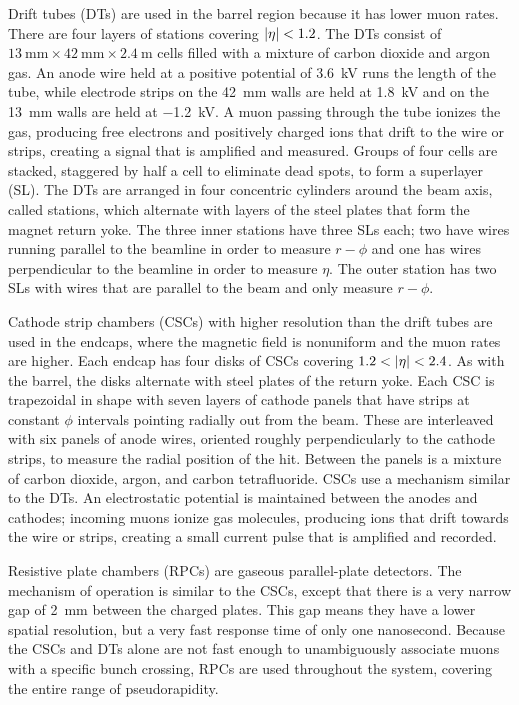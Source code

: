 Drift tubes (DTs) are used in the barrel region because it has lower muon rates.
There are four layers of stations covering $\lvert\eta\rvert < 1.2$. The DTs consist
of $\SI{13}{\mm} \times \SI{42}{\mm} \times \SI{2.4}{\meter}$ cells filled with
a mixture of carbon dioxide and argon gas. An anode wire held at a positive
potential of \SI{3.6}{\kilo\volt} runs the length of the tube, while electrode
strips on the \SI{42}{\mm} walls are held at \SI{1.8}{\kilo\volt} and on the
\SI{13}{\mm} walls are held at \SI{-1.2}{\kilo\volt}. A muon passing through the
tube ionizes the gas, producing free electrons and positively charged ions that
drift to the wire or strips, creating a signal that is amplified and measured.
Groups of four cells are stacked, staggered by half a cell to eliminate dead
spots, to form a superlayer (SL). The DTs are arranged in four concentric
cylinders around the beam axis, called stations, which alternate with layers of
the steel plates that form the magnet return yoke. The three inner stations have
three SLs each; two have wires running parallel to the beamline in order to
measure $r-\phi$ and one has wires perpendicular to the beamline in order to
measure $\eta$. The outer station has two SLs with wires that are parallel to
the beam and only measure $r-\phi$.

Cathode strip chambers (CSCs) with higher resolution than the drift tubes are
used in the endcaps, where the magnetic field is nonuniform and the muon rates
are higher. Each endcap has four disks of CSCs covering $1.2 < \lvert\eta\rvert <
2.4$. As with the barrel, the disks alternate with steel plates of the return
yoke. Each CSC is trapezoidal in shape with seven layers of cathode panels that
have strips at constant $\phi$ intervals pointing radially out from the beam.
These are interleaved with six panels of anode wires, oriented roughly
perpendicularly to the cathode strips, to measure the radial position of the
hit. Between the panels is a mixture of carbon dioxide, argon, and carbon
tetrafluoride. CSCs use a mechanism similar to the DTs. An electrostatic
potential is maintained between the anodes and cathodes; incoming muons ionize
gas molecules, producing ions that drift towards the wire or strips, creating a
small current pulse that is amplified and recorded.

Resistive plate chambers (RPCs) are gaseous parallel-plate detectors. The
mechanism of operation is similar to the CSCs, except that there is a very
narrow gap of \SI{2}{\milli\meter} between the charged plates. This gap means
they have a lower spatial resolution, but a very fast response time of only one
nanosecond. Because the CSCs and DTs alone are not fast enough to unambiguously
associate muons with a specific bunch crossing, RPCs are used throughout the
system, covering the entire range of pseudorapidity.

